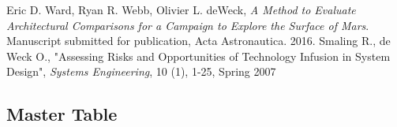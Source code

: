 \documentclass[11pt]{article} %
\begin{document}
\clearpage
\begin{thebibliography}{1}
 Eric D. Ward, Ryan R. Webb, Olivier L. deWeck, {\em A Method to Evaluate Architectural Comparisons for a Campaign to Explore the Surface of Mars}. Manuscript submitted for publication, Acta Astronautica. 2016.
Smaling R., de Weck O., "Assessing Risks and Opportunities of Technology Infusion in System Design", {\em Systems Engineering}, 10 (1), 1-25, Spring 2007
\end{thebibliography}

\clearpage
\begin{appendices}
\section{Master Table}


\end{appendices}
\end{document}
